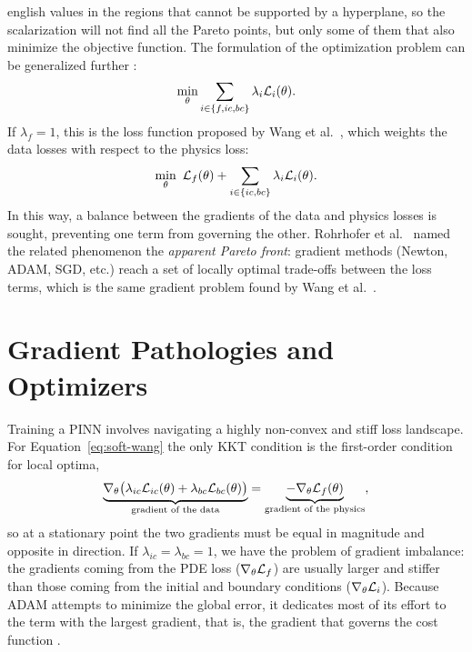 \documentclass[../0000.tex]{subfiles}
\begin{document}
\begin{hyphenrules}{english}
values in the regions that cannot be supported by a hyperplane, so the scalarization will not find all
the Pareto points, but only some of them that also minimize the objective function. The formulation of
the optimization problem can be generalized further \cite{rohrhofer2023}:
\begin{equation}
  \min_{\theta}\sum_{i\in\{f,ic,bc\}}\lambda_i\mathcal{L}_i(\theta).
  \label{eq:soft-general}
\end{equation}
If $\lambda_f=1$, this is the loss function proposed by Wang et al.~\cite{wang2021gradient}, which weights the
data losses with respect to the physics loss:
\begin{equation}
  \min_{\theta}\ \Loss_f(\theta)+\sum_{i\in\{ic,bc\}}\lambda_i\Loss_i(\theta).
  \label{eq:soft-wang}
\end{equation}
In this way, a balance between the gradients of the data and physics losses is sought, preventing one
term from governing the other. Rohrhofer et al.~\cite{rohrhofer2023} named the related phenomenon the \emph{apparent
Pareto front}: gradient methods (Newton, ADAM, SGD, etc.) reach a set of locally optimal trade-offs
between the loss terms, which is the same gradient problem found by Wang et al.~\cite{wang2021gradient}.

\section{Gradient Pathologies and Optimizers}\label{sec:gradient-pathologies}

Training a PINN involves navigating a highly non-convex and stiff loss landscape. For
Equation~\eqref{eq:soft-wang} the only KKT condition is the first-order condition for local optima,
\begin{equation}
  \underbrace{\nabla_\theta\big(\lambda_{ic}\mathcal{L}_{ic}(\theta)+\lambda_{bc}\mathcal{L}_{bc}(\theta)\big)}_{\text{gradient of the data}}
  =\underbrace{-\nabla_\theta\mathcal{L}_f(\theta)}_{\text{gradient of the physics}},
  \label{eq:kkt-soft}
\end{equation}
so at a stationary point the two gradients must be equal in magnitude and opposite in direction. If
$\lambda_{ic}=\lambda_{bc}=1$, we have the problem of gradient imbalance: the gradients coming from the
PDE loss ($\nabla_\theta\mathcal{L}_f$) are usually larger and stiffer than those coming from the initial and
boundary conditions ($\nabla_\theta\mathcal{L}_i$). Because ADAM attempts to minimize the global error, it
dedicates most of its effort to the term with the largest gradient, that is, the gradient that governs
the cost function \cite{wang2021gradient}.


\end{hyphenrules}
\end{document}
